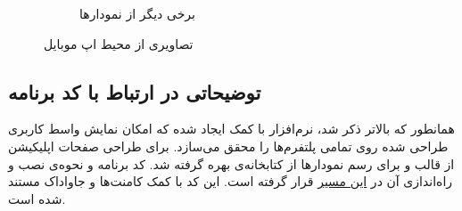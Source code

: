 \begin{figure}[h]
\begin{subfigure}[b]{0.475\textwidth}
		\caption[برخی دیگر از نمودارها]%
		{{\small برخی دیگر از نمودارها}}    
		\label{initial_charts2}
	\end{subfigure}
	\caption[ تصاویری از محیط اپ موبایل]
	{\small تصاویری از محیط اپ موبایل} 
	\label{app_screenshots}
\end{figure}


\subsection{توضیحاتی در ارتباط با کد برنامه}
همانطور که بالاتر ذکر شد، نرم‌افزار با کمک  ایجاد شده که امکان نمایش واسط کاربری طراحی شده روی تمامی پلتفرم‌ها را محقق می‌سازد. برای طراحی صفحات اپلیکیشن از قالب  و برای رسم نمودارها از کتابخانه‌ی  بهره گرفته شد.
کد برنامه و نحوه‌ی نصب و راه‌اندازی آن در 
\href{https://github.com/Sharif-University-ESRLab/project-team-2/tree/main/Code/app}{این مسیر}
قرار گرفته است. این کد با کمک کامنت‌ها و جاواداک مستند شده است.




